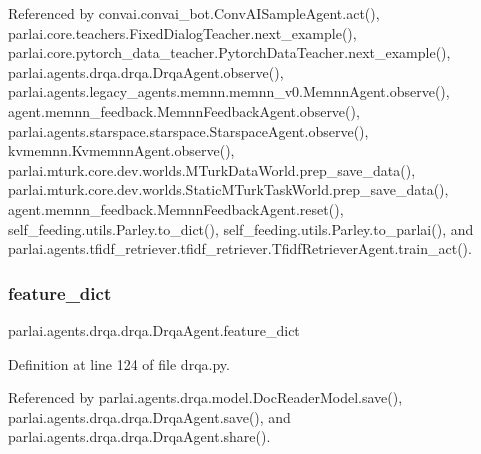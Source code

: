 Referenced by convai.\+convai\+\_\+bot.\+Conv\+A\+I\+Sample\+Agent.\+act(), parlai.\+core.\+teachers.\+Fixed\+Dialog\+Teacher.\+next\+\_\+example(), parlai.\+core.\+pytorch\+\_\+data\+\_\+teacher.\+Pytorch\+Data\+Teacher.\+next\+\_\+example(), parlai.\+agents.\+drqa.\+drqa.\+Drqa\+Agent.\+observe(), parlai.\+agents.\+legacy\+\_\+agents.\+memnn.\+memnn\+\_\+v0.\+Memnn\+Agent.\+observe(), agent.\+memnn\+\_\+feedback.\+Memnn\+Feedback\+Agent.\+observe(), parlai.\+agents.\+starspace.\+starspace.\+Starspace\+Agent.\+observe(), kvmemnn.\+Kvmemnn\+Agent.\+observe(), parlai.\+mturk.\+core.\+dev.\+worlds.\+M\+Turk\+Data\+World.\+prep\+\_\+save\+\_\+data(), parlai.\+mturk.\+core.\+dev.\+worlds.\+Static\+M\+Turk\+Task\+World.\+prep\+\_\+save\+\_\+data(), agent.\+memnn\+\_\+feedback.\+Memnn\+Feedback\+Agent.\+reset(), self\+\_\+feeding.\+utils.\+Parley.\+to\+\_\+dict(), self\+\_\+feeding.\+utils.\+Parley.\+to\+\_\+parlai(), and parlai.\+agents.\+tfidf\+\_\+retriever.\+tfidf\+\_\+retriever.\+Tfidf\+Retriever\+Agent.\+train\+\_\+act().

\mbox{\label{classparlai_1_1agents_1_1drqa_1_1drqa_1_1DrqaAgent_aad3576cea9fa96bdb5bf3d9a6209c93c}} 
\subsubsection{\texorpdfstring{feature\+\_\+dict}{feature\_dict}}
{\footnotesize\ttfamily parlai.\+agents.\+drqa.\+drqa.\+Drqa\+Agent.\+feature\+\_\+dict}



Definition at line 124 of file drqa.\+py.



Referenced by parlai.\+agents.\+drqa.\+model.\+Doc\+Reader\+Model.\+save(), parlai.\+agents.\+drqa.\+drqa.\+Drqa\+Agent.\+save(), and parlai.\+agents.\+drqa.\+drqa.\+Drqa\+Agent.\+share().

\mbox{\label{classparlai_1_1agents_1_1drqa_1_1drqa_1_1DrqaAgent_ac7b97d4092ac9dd221214832416b2002}} 
